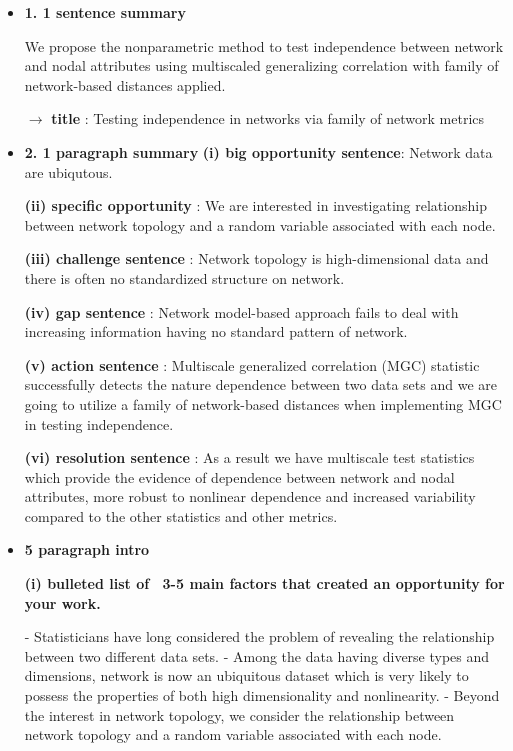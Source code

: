 \documentclass[12pt]{article}
\begin{document}
\begin{itemize}

\item \textbf{1.  1 sentence summary}

We propose the nonparametric method to test independence between network and nodal attributes using multiscaled generalizing correlation with family of network-based distances applied.

$\rightarrow$ \textbf{title} : Testing independence in networks via family of network metrics


\item \textbf{2.  1 paragraph summary} 
\subitem \textbf{(i) big opportunity sentence}: Network data are ubiqutous.

\subitem \textbf{(ii) specific opportunity} : We are interested in investigating relationship between network topology and a random variable associated with each node.

\subitem \textbf{(iii) challenge sentence} : Network topology is high-dimensional data and there is often no standardized structure on network.

\subitem \textbf{(iv) gap sentence} : Network model-based approach fails to deal with increasing information having no standard pattern of network.

\subitem \textbf{(v)  action sentence} : Multiscale generalized correlation (MGC) statistic successfully detects the nature dependence between two data sets and we are going to utilize a family of network-based distances when implementing MGC in testing independence.

\subitem \textbf{(vi) resolution sentence} : As a result we have multiscale test statistics which provide the evidence of dependence between network and nodal attributes, more robust to nonlinear dependence and increased variability compared to the other statistics and other metrics.


\item \textbf{5 paragraph intro}

\subitem \textbf{(i) bulleted list of ~3-5 main factors that created an opportunity for your work.}

\subsubitem - Statisticians have long considered the problem of revealing the relationship between two different data sets.
\subsubitem - Among the data having diverse types and dimensions, network is now an ubiquitous dataset which is very likely to possess the properties of both high dimensionality and nonlinearity.
\subsubitem - Beyond the interest in network topology, we consider the relationship between network topology and a random variable associated with each node. 


\end{itemize}
\end{document}
